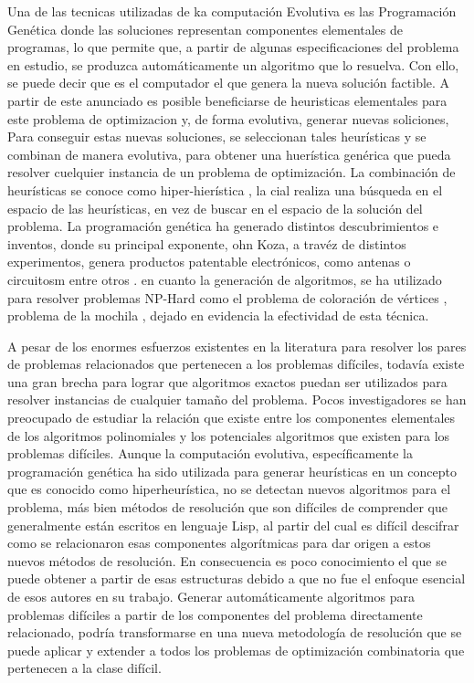 Una de las tecnicas utilizadas de ka computación Evolutiva es las Programación Genética donde las soluciones representan componentes elementales de programas, lo que permite que, a partir de algunas especificaciones del problema en estudio, se produzca automáticamente un algoritmo que lo resuelva. Con ello, se puede decir que es el computador el que genera la nueva solución factible. A partir de este anunciado es posible beneficiarse de heuristicas elementales para este problema de optimizacion y, de forma evolutiva, generar nuevas soliciones, Para conseguir estas nuevas soluciones, se seleccionan tales heurísticas y se combinan de manera evolutiva, para obtener una huerística genérica que pueda resolver cuelquier instancia de un problema de optimización. La combinación de heurísticas se conoce como hiper-hierística \citep{burke2010genetic}, la cial realiza una búsqueda en el espacio de las heurísticas, en vez de buscar en el espacio de la solución del problema. La programación genética ha generado distintos descubrimientos e inventos, donde su principal exponente, ohn Koza, a travéz de distintos experimentos, genera productos patentable electrónicos, como antenas o circuitosm entre otros \citep{Koza03}. en cuanto la generación de algoritmos, se ha utilizado para resolver problemas NP-Hard como el problema de coloración de vértices \citep{bolton2013}, problema de la mochila \citep{parada_2015}, dejado en evidencia la efectividad de esta técnica. 


A pesar de los enormes esfuerzos existentes en la literatura para resolver los pares de problemas relacionados que pertenecen a los problemas difíciles, todavía existe una gran brecha para lograr que algoritmos exactos puedan ser utilizados para resolver instancias de cualquier tamaño del problema. Pocos investigadores se han preocupado de estudiar la relación que existe entre los componentes elementales de los algoritmos polinomiales  y los potenciales algoritmos que existen para los problemas difíciles. Aunque la computación evolutiva, específicamente la  programación genética ha sido utilizada para generar heurísticas en un concepto que es conocido como hiperheurística, no se detectan nuevos algoritmos para el problema, más bien métodos de resolución que son difíciles de comprender que generalmente están escritos en lenguaje Lisp, al partir del cual es difícil descifrar como se relacionaron esas componentes algorítmicas para dar origen a estos nuevos métodos de resolución. En consecuencia es poco conocimiento el que se puede obtener a partir de esas estructuras debido a que no fue el enfoque esencial de esos autores en su trabajo. Generar automáticamente algoritmos para problemas difíciles a partir de los componentes del problema directamente relacionado, podría transformarse en una nueva metodología de resolución que se puede aplicar y extender a todos los problemas de optimización combinatoria que pertenecen a la clase difícil.

